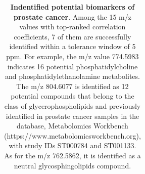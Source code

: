 \documentclass{WileyMSP-template}
\begin{document}
\begin{landscape}
\begin{table}
\begin{adjustbox}{center}
{\begin{tabular}{|c|c|c|c|c|c|c|c|c|c|c|c|c|}
 
            
            \bottomrule
        \end{tabular}
        }
    \end{adjustbox}
    \captionsetup{justification=raggedright,singlelinecheck=false}
    \caption
    {
      \textbf{Indentified potential biomarkers of prostate cancer}. 
      Among the 15 m/z values with top-ranked correlation coefficients, 
      7 of them are successfully identified within a tolerance window of 5 ppm. 
      For example, the m/z value 774.5983 
      indicates 16 potential phosphatidylcholine 
      and phosphatidylethanolamine metabolites. 
      The m/z 804.6077 is identified as 12 potential 
      compounds that belong to the class of glycerophospholipids 
      and previously identified in prostate
      cancer samples in the database, Metabolomics Workbench 
      (https://www.metabolomicsworkbench.org), with
      study IDs ST000784 and ST001133. As for the m/z 762.5862, 
      it is identified as a neutral glycosphingolipids compound. 
    }
    \label{tab:postatetab}
\end{table}
\end{landscape} 
 
\end{document}
